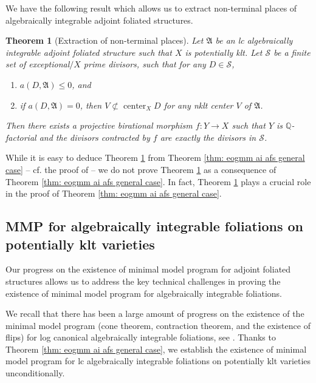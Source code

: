 \documentclass[12pt]{amsart}
\numberwithin{equation}{section}
\newcommand{\Qq}{\mathbb{Q}}
\newcommand{\Center}{\operatorname{center}}
\newcommand{\Aa}{{\mathfrak{A}}}
\newtheorem{thmsub}{Theorem}[subsection]
\theoremstyle{definition}
\theoremstyle{definition}
\theoremstyle{definition}
\begin{document}
We have the following result which allows us to extract non-terminal places of algebraically integrable adjoint foliated structures. 


\begin{thmsub}[Extraction of non-terminal places]\label{thm: extract non-terminal place intro}
   Let $\Aa$ be an lc algebraically integrable adjoint foliated structure such that $X$ is potentially klt. Let $\mathcal{S}$ be a finite set of exceptional$/X$ prime divisors, such that for any $D\in\mathcal{S}$,
   \begin{enumerate}
       \item $a(D,\Aa)\leq 0$, and
       \item if $a(D,\Aa)=0$, then $V\not\subset\Center_XD$ for any nklt center $V$ of $\Aa$.
   \end{enumerate}
   Then there exists a projective birational morphism $f: Y\rightarrow X$ such that $Y$ is $\Qq$-factorial and the divisors contracted by $f$ are exactly the divisors in $\mathcal{S}$.
\end{thmsub}

While it is easy to deduce Theorem \ref{thm: extract non-terminal place intro} from Theorem \ref{thm: eogmm ai afs general case} -- 
cf. the proof of \cite[Corollary 1.4.3]{BCHM10} --
we do not prove Theorem \ref{thm: extract non-terminal place intro} as a consequence of Theorem \ref{thm: eogmm ai afs general case}. In fact, Theorem \ref{thm: extract non-terminal place intro} plays a crucial role in the proof of Theorem \ref{thm: eogmm ai afs general case}. 





\subsection{MMP for algebraically integrable foliations on potentially klt varieties}

Our progress on the existence of minimal model program for adjoint foliated structures allows us to address the key technical challenges in proving the existence of minimal model program for algebraically integrable foliations. 

We recall that there has been a large amount of progress on the existence of the minimal model program (cone theorem, contraction theorem, and the existence of flips) for log canonical algebraically integrable foliations, see \cite{ACSS21,CHLX23,CS24,LMX24,CHLMSSX24}. Thanks to Theorem \ref{thm: eogmm ai afs general case}, we establish the existence of minimal model program for lc algebraically integrable foliations on potentially klt varieties unconditionally.
\end{document}
